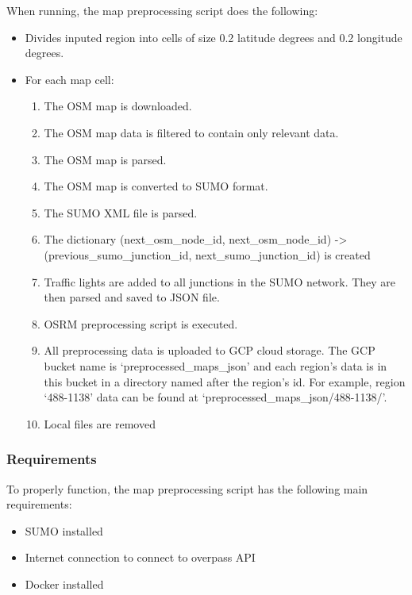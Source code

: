 \documentclass[letterpaper,10pt,english]{sphinxmanual}
\begin{document}
When running, the map preprocessing script does the following:
\begin{itemize}
\item {} 
Divides inputed region into cells of size 0.2 latitude degrees and 0.2 longitude degrees.

\item {} 
For each map cell:
\begin{enumerate}
\def\theenumi{\arabic{enumi}}
\def\labelenumi{\theenumi .}
\makeatletter\def\p@enumii{\p@enumi \theenumi .}\makeatother
\item {} 
The OSM map is downloaded.

\item {} 
The OSM map data is filtered to contain only relevant data.

\item {} 
The OSM map is parsed.

\item {} 
The OSM map is converted to SUMO format.

\item {} 
The SUMO XML file is parsed.

\item {} 
The dictionary (next\_osm\_node\_id, next\_osm\_node\_id) -\textgreater{} (previous\_sumo\_junction\_id, next\_sumo\_junction\_id) is created

\item {} 
Traffic lights are added to all junctions in the SUMO network. They are then parsed and saved to JSON file.

\item {} 
OSRM preprocessing script is executed.

\item {} 
All preprocessing data is uploaded to GCP cloud storage. The GCP bucket name is ‘preprocessed\_maps\_json’ and each region’s data is in this bucket in a directory named after the region’s id. For example, region ‘488-1138’ data can be found at ‘preprocessed\_maps\_json/488-1138/’.

\item {} 
Local files are removed

\end{enumerate}

\end{itemize}


\subsubsection{Requirements}
\label{\detokenize{microservices/map_preprocessing/introduction:requirements}}
To properly function, the map preprocessing script has the following main requirements:
\begin{itemize}
\item {} 
SUMO installed

\item {} 
Internet connection to connect to overpass API

\item {} 
Docker installed

\end{itemize}
\end{document}
